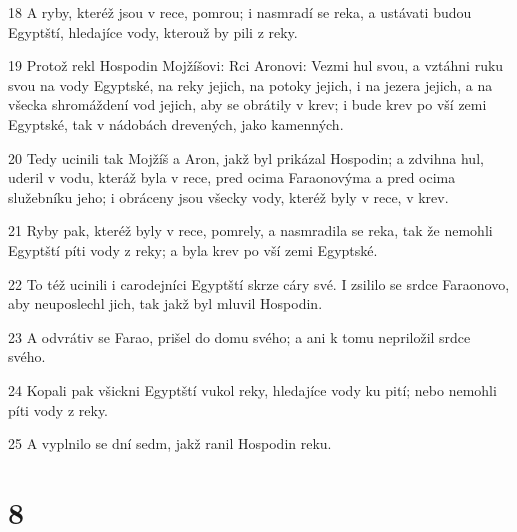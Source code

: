 \par 18 A ryby, kteréž jsou v rece, pomrou; i nasmradí se reka, a ustávati budou Egyptští, hledajíce vody, kterouž by pili z reky.
\par 19 Protož rekl Hospodin Mojžíšovi: Rci Aronovi: Vezmi hul svou, a vztáhni ruku svou na vody Egyptské, na reky jejich, na potoky jejich, i na jezera jejich, a na všecka shromáždení vod jejich, aby se obrátily v krev; i bude krev po vší zemi Egyptské, tak v nádobách drevených, jako kamenných.
\par 20 Tedy ucinili tak Mojžíš a Aron, jakž byl prikázal Hospodin; a zdvihna hul, uderil v vodu, kteráž byla v rece, pred ocima Faraonovýma a pred ocima služebníku jeho; i obráceny jsou všecky vody, kteréž byly v rece, v krev.
\par 21 Ryby pak, kteréž byly v rece, pomrely, a nasmradila se reka, tak že nemohli Egyptští píti vody z reky; a byla krev po vší zemi Egyptské.
\par 22 To též ucinili i carodejníci Egyptští skrze cáry své. I zsililo se srdce Faraonovo, aby neuposlechl jich, tak jakž byl mluvil Hospodin.
\par 23 A odvrátiv se Farao, prišel do domu svého; a ani k tomu nepriložil srdce svého.
\par 24 Kopali pak všickni Egyptští vukol reky, hledajíce vody ku pití; nebo nemohli píti vody z reky.
\par 25 A vyplnilo se dní sedm, jakž ranil Hospodin reku.

\chapter{8}

